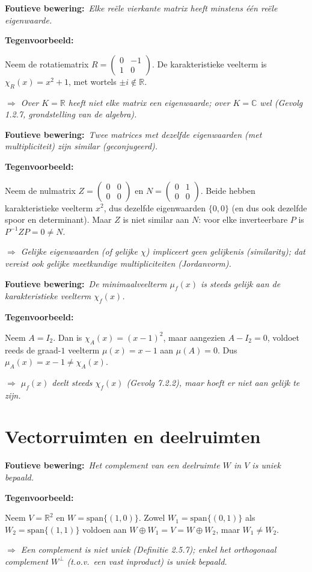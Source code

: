 \documentclass[10pt,a4paper]{article}
\newenvironment{ce}[1]{%
  \par\noindent\textbf{Foutieve bewering:}~\textit{#1}\par\noindent\textbf{Tegenvoorbeeld:}~\ignorespaces
}{%
  \par\vspace{5pt}\normalfont
}
\newcommand{\concl}[1]{\par\noindent\textit{$\Rightarrow$ #1}}
\begin{document}
\begin{ce}{Elke re\"ele vierkante matrix heeft minstens \'e\'en re\"ele eigenwaarde.}
Neem de rotatiematrix $R=\begin{pmatrix}0&-1\\1&0\end{pmatrix}$. De karakteristieke veelterm is $\chi_R(x)=x^2+1$, met wortels $\pm i\notin\mathbb R$.
\concl{Over $K=\mathbb R$ heeft niet elke matrix een eigenwaarde; over $K=\mathbb C$ wel (Gevolg 1.2.7, grondstelling van de algebra).}
\end{ce}

\begin{ce}{Twee matrices met dezelfde eigenwaarden (met multipliciteit) zijn similar (geconjugeerd).}
Neem de nulmatrix $Z=\begin{pmatrix}0&0\\0&0\end{pmatrix}$ en $N=\begin{pmatrix}0&1\\0&0\end{pmatrix}$. Beide hebben karakteristieke veelterm $x^2$, dus dezelfde eigenwaarden $\{0,0\}$ (en dus ook dezelfde spoor en determinant). Maar $Z$ is niet similar aan $N$: voor elke inverteerbare $P$ is $P^{-1}ZP=0\ne N$.
\concl{Gelijke eigenwaarden (of gelijke $\chi$) impliceert geen gelijkenis (\emph{similarity}); dat vereist ook gelijke meetkundige multipliciteiten (Jordanvorm).}
\end{ce}

\begin{ce}{De minimaalveelterm $\mu_f(x)$ is steeds gelijk aan de karakteristieke veelterm $\chi_f(x)$.}
Neem $A=I_2$. Dan is $\chi_A(x)=(x-1)^2$, maar aangezien $A-I_2=0$, voldoet reeds de graad-$1$ veelterm $\mu(x)=x-1$ aan $\mu(A)=0$. Dus $\mu_A(x)=x-1\ne\chi_A(x)$.
\concl{$\mu_f(x)$ deelt steeds $\chi_f(x)$ (Gevolg 7.2.2), maar hoeft er niet aan gelijk te zijn.}
\end{ce}

\section{Vectorruimten en deelruimten}

\begin{ce}{Het complement van een deelruimte $W$ in $V$ is uniek bepaald.}
Neem $V=\mathbb R^2$ en $W=\mathrm{span}\{(1,0)\}$. Zowel $W_1=\mathrm{span}\{(0,1)\}$ als $W_2=\mathrm{span}\{(1,1)\}$ voldoen aan $W\oplus W_1=V=W\oplus W_2$, maar $W_1\ne W_2$.
\concl{Een complement is niet uniek (Definitie 2.5.7); enkel het \emph{orthogonaal} complement $W^\perp$ (t.o.v.\ een vast inproduct) is uniek bepaald.}
\end{ce}
\end{document}
